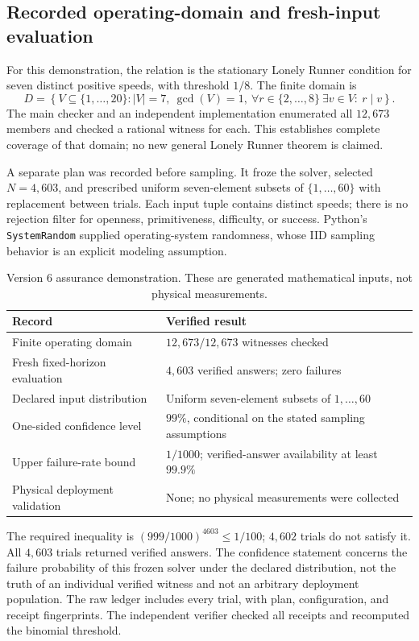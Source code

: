 \subsection{Recorded operating-domain and fresh-input evaluation}

For this demonstration, the relation is the stationary Lonely Runner condition
for seven distinct positive speeds, with threshold $1/8$. The finite domain is
\[
 D=\left\{V\subseteq\{1,\ldots,20\}: |V|=7,\ \gcd(V)=1,
   \ \forall r\in\{2,\ldots,8\}\ \exists v\in V:\ r\mid v\right\}.
\]
The main checker and an independent implementation enumerated all $12{,}673$
members and checked a rational witness for each. This establishes complete
coverage of that domain; no new general Lonely Runner theorem is claimed.

A separate plan was recorded before sampling. It froze the solver, selected
$N=4{,}603$, and prescribed uniform seven-element subsets of $\{1,\ldots,60\}$
with replacement between trials. Each input tuple contains distinct speeds;
there is no rejection filter for openness, primitiveness, difficulty, or
success. Python's \texttt{SystemRandom} supplied operating-system randomness,
whose IID sampling behavior is an explicit modeling assumption.

\begin{table}[htbp]
\centering
\caption{Version 6 assurance demonstration. These are generated mathematical
inputs, not physical measurements.}
\begin{tabularx}{\linewidth}{@{}lX@{}}
\toprule
Record & Verified result\\
\midrule
Finite operating domain & $12{,}673/12{,}673$ witnesses checked\\
Fresh fixed-horizon evaluation & $4{,}603$ verified answers; zero failures\\
Declared input distribution & Uniform seven-element subsets of $1,\ldots,60$\\
One-sided confidence level & $99\%$, conditional on the stated sampling assumptions\\
Upper failure-rate bound & $1/1000$; verified-answer availability at least $99.9\%$\\
Physical deployment validation & None; no physical measurements were collected\\
\bottomrule
\end{tabularx}
\label{tab:assurance-results}
\end{table}

The required inequality is $(999/1000)^{4603}\le1/100$; $4{,}602$ trials do not
satisfy it. All $4{,}603$ trials returned verified answers. The confidence
statement concerns the failure probability of this frozen solver under the
declared distribution, not the truth of an individual verified witness and not
an arbitrary deployment population. The raw ledger includes every trial, with
plan, configuration, and receipt fingerprints. The independent verifier checked
all receipts and recomputed the binomial threshold.

